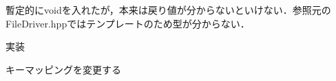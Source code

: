 
\begin{DoxyRefList}
\item[Class \mbox{\hyperlink{classfileIO_1_1FileIO}{file\+IO\+::File\+IO}} ]\label{todo__todo000001}%
%
暫定的にvoidを入れたが，本来は戻り値が分からないといけない．参照元の\+File\+Driver.\+hppではテンプレートのため型が分からない．  
\item[Class \mbox{\hyperlink{classinputHandler_1_1CommandInput}{input\+Handler\+::Command\+Input}} ]\label{todo__todo000002}%
%
実装  
\item[Member \mbox{\hyperlink{classUI_1_1NcursesUI_a1034326949b2711b773d8d946788c9b8}{UI\+::Ncurses\+UI\+::Get\+Input}} () -\/$>$ int override]\label{todo__todo000003}%
%
キーマッピングを変更する 
\end{DoxyRefList}
